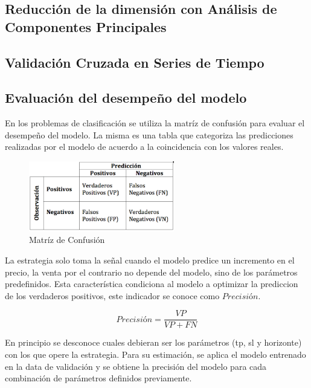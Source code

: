 \documentclass[a4paper,12pt]{Latex/Classes/PhDthesisPSnPDF}
\begin{document}
\subsection{Reducción de la dimensión con Análisis de Componentes Principales}

\subsection{Validación Cruzada en Series de Tiempo}

\subsection{Evaluación del desempeño del modelo}

En los problemas de clasificación se utiliza la matríz de confusión para evaluar el desempeño del modelo. La misma es una tabla que categoriza las predicciones realizadas por el modelo de acuerdo a la coincidencia con los valores reales. 

\begin{figure}[ht]
\begin{center}
\includegraphics[width=2.5in]{images/confusion_matrix}
\end{center}
\caption{Matríz de Confusión}
\end{figure}

La estrategia solo toma la señal cuando el modelo predice un incremento en el precio, la venta por el contrario no depende del modelo, sino de los parámetros predefinidos. Esta característica condiciona al modelo a optimizar la prediccion de los verdaderos positivos, este indicador se conoce como $Precisión$.

$$ Precisión = \frac{VP}{VP + FN} $$

En principio se desconoce cuales debieran ser los parámetros (tp, sl y horizonte) con los que opere la estrategia. Para su estimación, se aplica el modelo entrenado en la data de validación y se obtiene la precisión del modelo para cada combinación de parámetros definidos previamente. 

\end{document}
